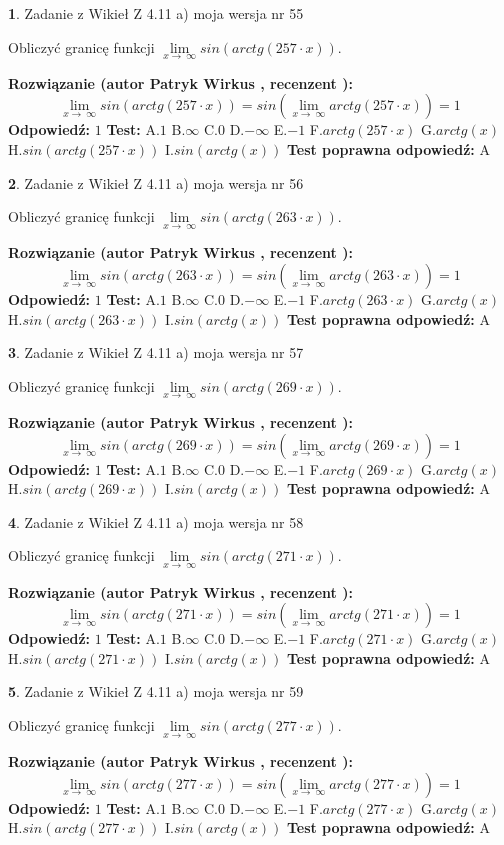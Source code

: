 \documentclass[12pt, a4paper]{article}
\theoremstyle{definition} %
\newtheorem{zad}{}
\newcommand{\zadStart}[1]{\begin{zad}#1\newline}
\newcommand{\zadStop}{\end{zad}}
\newcommand{\rozwStart}[2]{\noindent \textbf{Rozwiązanie (autor #1 , recenzent #2): }\newline}
\newcommand{\rozwStop}{\newline}
\newcommand{\odpStart}{\noindent \textbf{Odpowiedź:}\newline}
\newcommand{\odpStop}{\newline}
\newcommand{\testStart}{\noindent \textbf{Test:}\newline}
\newcommand{\testStop}{\newline}
\newcommand{\kluczStart}{\noindent \textbf{Test poprawna odpowiedź:}\newline}
\newcommand{\kluczStop}{\newline}
\begin{document}
\zadStart{Zadanie z Wikieł Z 4.11 a) moja wersja nr 55}

Obliczyć granicę funkcji  $\lim\limits_{x\to\ \infty}sin(arctg(257\cdot x))$.
\zadStop
\rozwStart{Patryk Wirkus}{}
$$\lim\limits_{x\to\ \infty}sin(arctg(257\cdot x)) = sin(\lim\limits_{x\to\ \infty}arctg(257\cdot x)) = 1$$
\rozwStop
\odpStart
$1$
\odpStop
\testStart
A.$1$ B.$\infty$ C.$0$ D.$-\infty$ E.$-1$
F.$arctg(257\cdot x)$ G.$arctg(x)$
H.$sin(arctg(257\cdot x))$
I.$sin(arctg(x))$
\testStop
\kluczStart
A
\kluczStop



\zadStart{Zadanie z Wikieł Z 4.11 a) moja wersja nr 56}

Obliczyć granicę funkcji  $\lim\limits_{x\to\ \infty}sin(arctg(263\cdot x))$.
\zadStop
\rozwStart{Patryk Wirkus}{}
$$\lim\limits_{x\to\ \infty}sin(arctg(263\cdot x)) = sin(\lim\limits_{x\to\ \infty}arctg(263\cdot x)) = 1$$
\rozwStop
\odpStart
$1$
\odpStop
\testStart
A.$1$ B.$\infty$ C.$0$ D.$-\infty$ E.$-1$
F.$arctg(263\cdot x)$ G.$arctg(x)$
H.$sin(arctg(263\cdot x))$
I.$sin(arctg(x))$
\testStop
\kluczStart
A
\kluczStop



\zadStart{Zadanie z Wikieł Z 4.11 a) moja wersja nr 57}

Obliczyć granicę funkcji  $\lim\limits_{x\to\ \infty}sin(arctg(269\cdot x))$.
\zadStop
\rozwStart{Patryk Wirkus}{}
$$\lim\limits_{x\to\ \infty}sin(arctg(269\cdot x)) = sin(\lim\limits_{x\to\ \infty}arctg(269\cdot x)) = 1$$
\rozwStop
\odpStart
$1$
\odpStop
\testStart
A.$1$ B.$\infty$ C.$0$ D.$-\infty$ E.$-1$
F.$arctg(269\cdot x)$ G.$arctg(x)$
H.$sin(arctg(269\cdot x))$
I.$sin(arctg(x))$
\testStop
\kluczStart
A
\kluczStop



\zadStart{Zadanie z Wikieł Z 4.11 a) moja wersja nr 58}

Obliczyć granicę funkcji  $\lim\limits_{x\to\ \infty}sin(arctg(271\cdot x))$.
\zadStop
\rozwStart{Patryk Wirkus}{}
$$\lim\limits_{x\to\ \infty}sin(arctg(271\cdot x)) = sin(\lim\limits_{x\to\ \infty}arctg(271\cdot x)) = 1$$
\rozwStop
\odpStart
$1$
\odpStop
\testStart
A.$1$ B.$\infty$ C.$0$ D.$-\infty$ E.$-1$
F.$arctg(271\cdot x)$ G.$arctg(x)$
H.$sin(arctg(271\cdot x))$
I.$sin(arctg(x))$
\testStop
\kluczStart
A
\kluczStop



\zadStart{Zadanie z Wikieł Z 4.11 a) moja wersja nr 59}

Obliczyć granicę funkcji  $\lim\limits_{x\to\ \infty}sin(arctg(277\cdot x))$.
\zadStop
\rozwStart{Patryk Wirkus}{}
$$\lim\limits_{x\to\ \infty}sin(arctg(277\cdot x)) = sin(\lim\limits_{x\to\ \infty}arctg(277\cdot x)) = 1$$
\rozwStop
\odpStart
$1$
\odpStop
\testStart
A.$1$ B.$\infty$ C.$0$ D.$-\infty$ E.$-1$
F.$arctg(277\cdot x)$ G.$arctg(x)$
H.$sin(arctg(277\cdot x))$
I.$sin(arctg(x))$
\testStop
\kluczStart
A
\kluczStop
\end{document}
